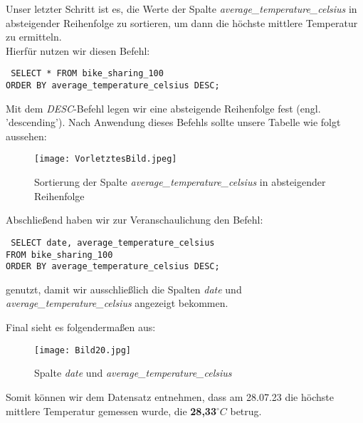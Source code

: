 \documentclass[a4paper, 12pt]{article}
\begin{document}
\newpage
{\fontsize{12}{15}\selectfont
Unser letzter Schritt ist es, die Werte der Spalte \textit{average\_temperature\_celsius} in absteigender Reihenfolge zu sortieren, um dann die höchste mittlere Temperatur zu ermitteln. \\
Hierfür nutzen wir diesen Befehl:

\vspace{\baselineskip}


{\fontsize{10}{12}\selectfont
\texttt{%
SELECT * FROM bike\_sharing\_100 \\
ORDER BY average\_temperature\_celsius DESC;
}}

\vspace{\baselineskip}

Mit dem \textit{DESC}-Befehl legen wir eine absteigende Reihenfolge fest (engl. 'descending'). Nach Anwendung dieses Befehls sollte unsere Tabelle wie folgt aussehen: 

\vspace{\baselineskip}

\begin{figure}[ht]
    \centering
    \texttt{[image: VorletztesBild.jpeg]}
    \par Sortierung der Spalte \textit{average\_temperature\_celsius} in absteigender Reihenfolge
\end{figure}

\vspace{\baselineskip}

Abschließend haben wir zur Veranschaulichung den Befehl:

\vspace{\baselineskip}
{\fontsize{10}{12}\selectfont
\texttt{%
SELECT date, average\_temperature\_celsius \\
FROM bike\_sharing\_100 \\
ORDER BY average\_temperature\_celsius DESC;}}

\vspace{\baselineskip}

genutzt, damit wir ausschließlich die Spalten \textit{date} und \textit{average\_temperature\_celsius} angezeigt bekommen.} 


\newpage
{\fontsize{12}{15}\selectfont
Final sieht es folgendermaßen aus:

\vspace{\baselineskip}

\begin{figure}[ht]
    \centering
    \texttt{[image: Bild20.jpg]}
    \par Spalte \textit{date} und \textit{average\_temperature\_celsius} 
\end{figure}

\vspace{\baselineskip}

Somit können wir dem Datensatz entnehmen, dass am 28.07.23 die höchste mittlere Temperatur gemessen wurde, die \textbf{28,33\(^\circ C\)} betrug.}
\end{document}
